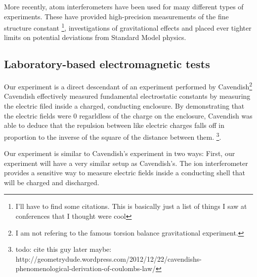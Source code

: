More recently, atom interferometers have been used for many different types of experiments. These have provided high-precision measurements of the fine structure constant \footnote{I'll have to find some citations. This is basically just a list of things I saw at conferences that I thought were cool}, investigations of gravitational effects and placed ever tighter limits on potential deviations from Standard Model physics. 

\subsection{Laboratory-based electromagnetic tests}
Our experiment is a direct descendant of an experiment performed by Cavendish\footnote{I am not refering to the famous torsion balance gravitational experiment.} Cavendish effectively measured fundamental electrostatic constants by measuring the electric filed inside a charged, conducting enclosure. By demonstrating that the electric fields were 0 regarldless of the charge on the enclosure, Cavendish was able to deduce that the repulsion between like electric charges falls off in proportion to the inverse of the square of the distance between them. \footnote{todo: cite this guy later maybe:  http://geometrydude.wordpress.com/2012/12/22/cavendishs-phenomenological-derivation-of-coulombs-law/}. 


Our experiment is similar to Cavendish's experiment in two ways: First, our experiment will have a very similar setup as Cavendish's. The ion interferometer provides a sensitive way to measure electric fields inside a conducting shell that will be charged and discharged.  

